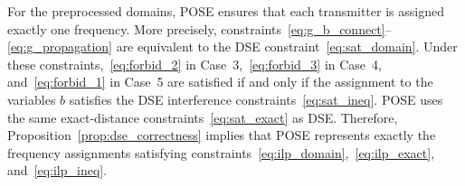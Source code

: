 \begin{proposition}
\label{prop:pose_correctness}
For the preprocessed domains, POSE ensures that each transmitter is assigned exactly one frequency. More precisely, constraints~\eqref{eq:g_b_connect}--\eqref{eq:g_propagation} are equivalent to the DSE constraint~\eqref{eq:sat_domain}.
Under these constraints,~\eqref{eq:forbid_2} in Case~3,~\eqref{eq:forbid_3} in Case~4, and~\eqref{eq:forbid_1} in Case~5 are satisfied if and only if the assignment to the variables $b$ satisfies the DSE interference constraints~\eqref{eq:sat_ineq}. 
POSE uses the same exact-distance constraints~\eqref{eq:sat_exact} as DSE. 
Therefore, Proposition~\ref{prop:dse_correctness} implies that POSE represents exactly the frequency assignments satisfying constraints~\eqref{eq:ilp_domain},~\eqref{eq:ilp_exact}, and~\eqref{eq:ilp_ineq}.
\end{proposition}
